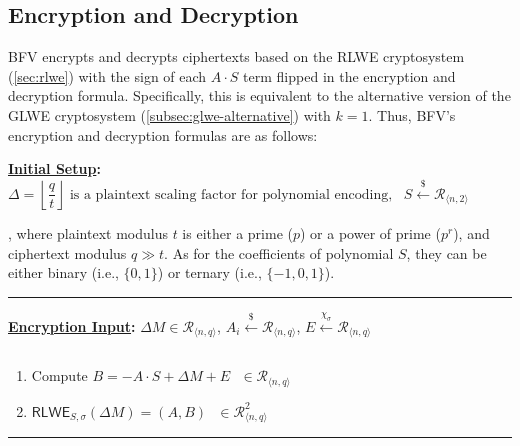 \subsection{Encryption and Decryption}
\label{subsec:bfv-enc-dec}

BFV encrypts and decrypts ciphertexts based on the RLWE cryptosystem (\autoref{sec:rlwe}) with the sign of each $A\cdot S$ term flipped in the encryption and decryption formula. Specifically, this is equivalent to the alternative version of the GLWE cryptosystem (\autoref{subsec:glwe-alternative}) with $k = 1$. Thus, BFV's encryption and decryption formulas are as follows: 



\begin{tcolorbox}[title={\textbf{\tboxlabel{\ref*{subsec:bfv-enc-dec}} BFV Encryption and Decryption}}]

\textbf{\underline{Initial Setup}:} $\Delta=\left\lfloor\dfrac{q}{t}\right\rfloor \text{ is a plaintext scaling factor for polynomial encoding}, \text{ } S \xleftarrow{\$} \mathcal{R}_{\langle n, 2 \rangle}$

, where plaintext modulus $t$ is either a prime ($p$) or a power of prime ($p^r$), and ciphertext modulus $q \gg t$. As for the coefficients of polynomial $S$, they can be either binary (i.e., $\{0, 1\}$) or ternary (i.e., $\{-1, 0, 1\}$).

\par\noindent\rule{\textwidth}{0.4pt}

\textbf{\underline{Encryption Input}:} $\Delta M \in \mathcal{R}_{\langle n, q \rangle}$, $A_i \xleftarrow{\$} \mathcal{R}_{\langle n, q \rangle}$, $E \xleftarrow{\chi_\sigma} \mathcal{R}_{\langle n, q \rangle}$


$ $

\begin{enumerate}

\item Compute $B = -A \cdot S + \Delta M + E \text{ } \in \mathcal{R}_{\langle n,q \rangle}$

\item $\textsf{RLWE}_{S,\sigma}(\Delta M) = (A, B) \text{ } \in \mathcal{R}_{\langle n,q \rangle}^2$ 

\end{enumerate}

\par\noindent\rule{\textwidth}{0.4pt}


\end{tcolorbox}
